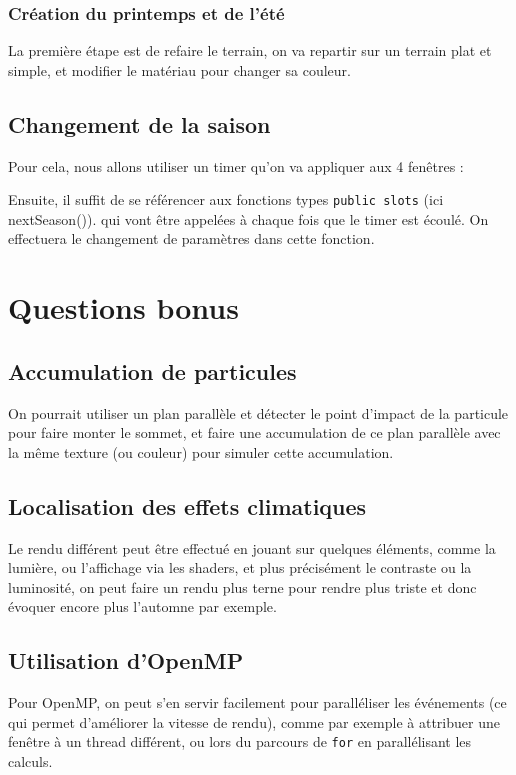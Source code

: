 \documentclass[a4paper,11pt]{report}
\begin{document}
	\subsubsection{Création du printemps et de l'été}
	La première étape est de refaire le terrain, on va repartir sur un terrain plat et simple, et modifier le matériau pour changer sa couleur.
	
	\subsection{Changement de la saison}
	Pour cela, nous allons utiliser un timer qu'on va appliquer aux 4 fenêtres :
	
	Ensuite, il suffit de se référencer aux fonctions types \texttt{public slots} (ici nextSeason()). qui vont être appelées à chaque fois que le timer est écoulé. On effectuera le changement de paramètres dans cette fonction.
	
	\pagebreak
	\section{Questions bonus}
	\subsection{Accumulation de particules}
	On pourrait utiliser un plan parallèle et détecter le point d'impact de la particule pour faire monter le sommet, et faire une accumulation de ce plan parallèle avec la même texture (ou couleur) pour simuler cette accumulation.
	
	\subsection{Localisation des effets climatiques}
	Le rendu différent peut être effectué en jouant sur quelques éléments, comme la lumière, ou l'affichage via les shaders, et plus précisément le contraste ou la luminosité, on peut faire un rendu plus terne pour rendre plus triste et donc évoquer encore plus l'automne par exemple.	
	
	\subsection{Utilisation d'OpenMP}
	Pour OpenMP, on peut s'en servir facilement pour paralléliser les événements (ce qui permet d'améliorer la vitesse de rendu), comme par exemple à attribuer une fenêtre à un thread différent, ou lors du parcours de \texttt{for} en parallélisant les calculs.
		
	
\end{document}
